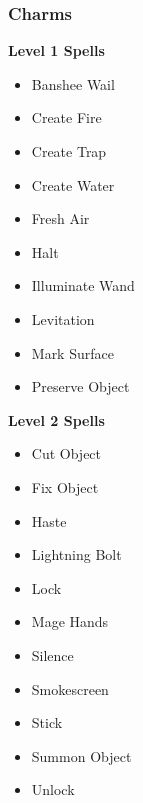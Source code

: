 \begin{multicols}{4} \raggedbottom\subsubsection{Charms}
\textbf{Level 1 Spells}
\begin{itemize}[itemsep=0em]
\renewcommand\labelitemi{-}
\item Banshee Wail

\item Create Fire

\item Create Trap

\item Create Water

\item Fresh Air

\item Halt

\item Illuminate Wand

\item Levitation

\item Mark Surface

\item Preserve Object


\end{itemize}
\textbf{Level 2 Spells}
\begin{itemize}[itemsep=0em]
\renewcommand\labelitemi{-}
\item Cut Object

\item Fix Object

\item Haste

\item Lightning Bolt

\item Lock

\item Mage Hands

\item Silence

\item Smokescreen

\item Stick

\item Summon Object

\item Unlock



\end{itemize}
\end{multicols}
